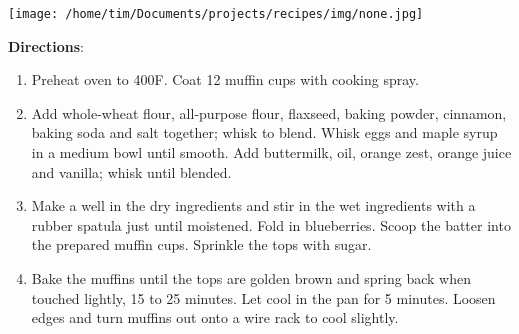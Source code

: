 \documentclass[11pt, twoside, openany]{book}
\begin{document}
\begin{minipage}[t]{\linewidth}
\begin{minipage}[t]{0.18\linewidth}
\centering \strut\vspace*{-\baselineskip}\newline
\texttt{[image: /home/tim/Documents/projects/recipes/img/none.jpg]}\\
\end{minipage}\vspace{3mm}
\textbf{Directions}:
\vspace{-3mm}\begin{enumerate}\setlength\itemsep{-1mm}
\item Preheat oven to 400F. Coat 12 muffin cups with cooking spray.
\item Add whole-wheat flour, all-purpose flour, flaxseed, baking powder, cinnamon, baking soda and salt together; whisk to blend. Whisk eggs and maple syrup in a medium bowl until smooth. Add buttermilk, oil, orange zest, orange juice and vanilla; whisk until blended.
\item Make a well in the dry ingredients and stir in the wet ingredients with a rubber spatula just until moistened. Fold in blueberries. Scoop the batter into the prepared muffin cups. Sprinkle the tops with sugar.
\item Bake the muffins until the tops are golden brown and spring back when touched lightly, 15 to 25 minutes. Let cool in the pan for 5 minutes. Loosen edges and turn muffins out onto a wire rack to cool slightly.
\end{enumerate}
\end{minipage}\vspace{8mm}
\end{document}
